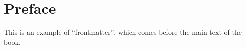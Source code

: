 \chapter{Preface}

This is an example of {}``frontmatter{}'', which comes before the main text of the book.
